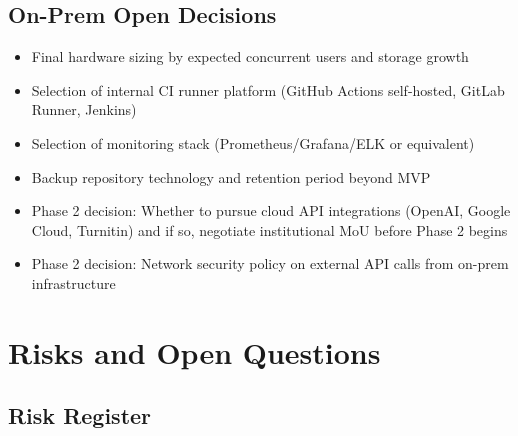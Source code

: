 \documentclass[12pt,a4paper]{report}
\begin{document}
\section{On-Prem Open Decisions}
\begin{itemize}
    \item Final hardware sizing by expected concurrent users and storage growth
    \item Selection of internal CI runner platform (GitHub Actions self-hosted, GitLab Runner, Jenkins)
    \item Selection of monitoring stack (Prometheus/Grafana/ELK or equivalent)
    \item Backup repository technology and retention period beyond MVP
    \item Phase 2 decision: Whether to pursue cloud API integrations (OpenAI, Google Cloud, Turnitin) and if so, negotiate institutional MoU before Phase 2 begins
    \item Phase 2 decision: Network security policy on external API calls from on-prem infrastructure
\end{itemize}

\chapter{Risks and Open Questions}

\section{Risk Register}
\end{document}
